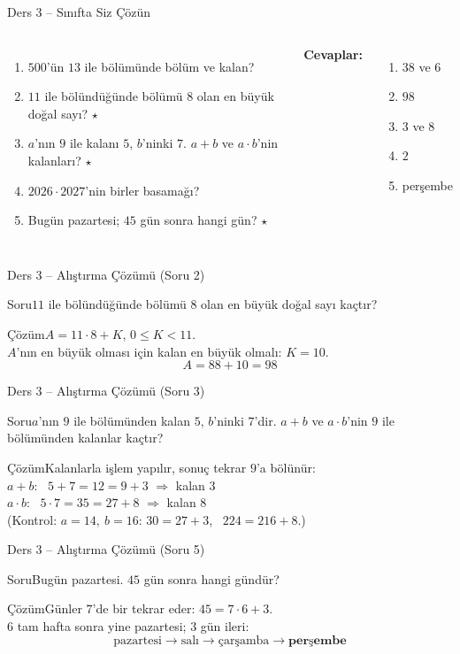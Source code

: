 \documentclass[aspectratio=169,11pt]{beamer}
\newcommand{\soru}[3]{%
\begin{frame}{#1}
  \begin{block}{Soru}\large #2\end{block}
  \pause
  \begin{exampleblock}{Çözüm}\large #3\end{exampleblock}
\end{frame}}
\begin{document}
\begin{frame}{Ders 3 -- Sınıfta Siz Çözün}
\begin{columns}[t]
\begin{enumerate}
\item \(500\)'ün \(13\) ile bölümünde bölüm ve kalan?
\item \(11\) ile bölündüğünde bölümü \(8\) olan en büyük doğal sayı? \(\star\)
\item \(a\)'nın \(9\) ile kalanı \(5\), \(b\)'ninki \(7\). \(a+b\) ve \(a\cdot b\)'nin kalanları? \(\star\)
\item \(2026\cdot 2027\)'nin birler basamağı?
\item Bugün pazartesi; \(45\) gün sonra hangi gün? \(\star\)
\end{enumerate}
\pause
\textbf{Cevaplar:}
\begin{enumerate}
\item \(38\) ve \(6\)
\item \(98\)
\item \(3\) ve \(8\)
\item \(2\)
\item perşembe
\end{enumerate}
\end{columns}
\vspace{4pt}{\footnotesize \(\star\) işaretli soruların adım adım çözümü sonraki slaytlardadır.}
\end{frame}

\soru{Ders 3 -- Alıştırma Çözümü (Soru 2)}
{\(11\) ile bölündüğünde bölümü \(8\) olan en büyük doğal sayı kaçtır?}
{\(A=11\cdot 8+K\), \quad \(0\le K<11\).\\[3pt]
\(A\)'nın en büyük olması için kalan en büyük olmalı: \(K=10\).
\[A=88+10=98\]}

\soru{Ders 3 -- Alıştırma Çözümü (Soru 3)}
{\(a\)'nın \(9\) ile bölümünden kalan \(5\), \(b\)'ninki \(7\)'dir. \(a+b\) ve \(a\cdot b\)'nin \(9\) ile bölümünden kalanlar kaçtır?}
{Kalanlarla işlem yapılır, sonuç tekrar \(9\)'a bölünür:\\[3pt]
\(a+b\): \ \(5+7=12=9+3\) \(\Rightarrow\) kalan \(3\)\\[3pt]
\(a\cdot b\): \ \(5\cdot 7=35=27+8\) \(\Rightarrow\) kalan \(8\)\\[3pt]
(Kontrol: \(a=14,\ b=16\): \(30=27+3\), \ \(224=216+8\).)}

\soru{Ders 3 -- Alıştırma Çözümü (Soru 5)}
{Bugün pazartesi. \(45\) gün sonra hangi gündür?}
{Günler \(7\)'de bir tekrar eder: \(45=7\cdot 6+3\).\\[3pt]
\(6\) tam hafta sonra yine pazartesi; \(3\) gün ileri:
\[\text{pazartesi}\rightarrow\text{salı}\rightarrow\text{çarşamba}\rightarrow\textbf{perşembe}\]}
\end{document}
